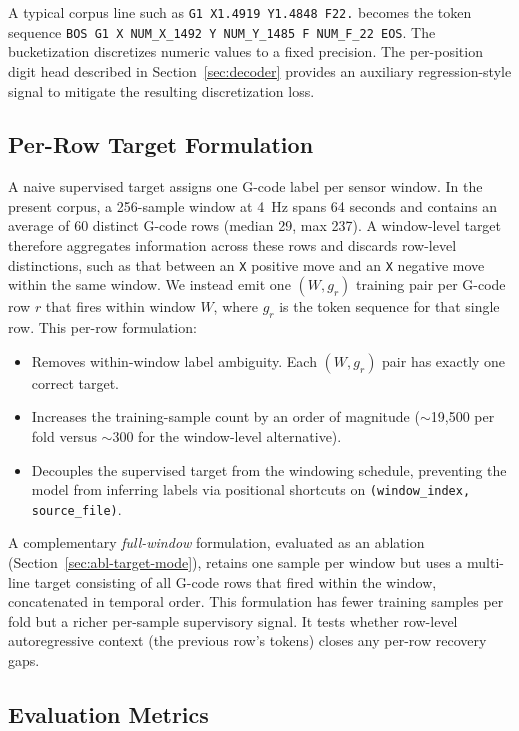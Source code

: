 \documentclass[sensors,article,submit,moreauthors,pdftex]{Definitions/mdpi}
\begin{document}
A typical corpus line such as \texttt{G1 X1.4919 Y1.4848 F22.} becomes the token sequence \texttt{BOS G1 X NUM\_X\_1492 Y NUM\_Y\_1485 F NUM\_F\_22 EOS}. The bucketization discretizes numeric values to a fixed precision. The per-position digit head described in Section~\ref{sec:decoder} provides an auxiliary regression-style signal to mitigate the resulting discretization loss.

\subsection{Per-Row Target Formulation}
\label{sec:per-row}

A naive supervised target assigns one G-code label per sensor window. In the present corpus, a 256-sample window at 4~Hz spans 64 seconds and contains an average of 60 distinct G-code rows (median 29, max 237). A window-level target therefore aggregates information across these rows and discards row-level distinctions, such as that between an \texttt{X} positive move and an \texttt{X} negative move within the same window. We instead emit one $(W, g_r)$ training pair per G-code row $r$ that fires within window $W$, where $g_r$ is the token sequence for that single row. This per-row formulation:

\begin{itemize}
\item Removes within-window label ambiguity. Each $(W, g_r)$ pair has exactly one correct target.
\item Increases the training-sample count by an order of magnitude ($\sim$19{,}500 per fold versus $\sim$300 for the window-level alternative).
\item Decouples the supervised target from the windowing schedule, preventing the model from inferring labels via positional shortcuts on \texttt{(window\_index, source\_file)}.
\end{itemize}

A complementary \emph{full-window} formulation, evaluated as an ablation (Section~\ref{sec:abl-target-mode}), retains one sample per window but uses a multi-line target consisting of all G-code rows that fired within the window, concatenated in temporal order. This formulation has fewer training samples per fold but a richer per-sample supervisory signal. It tests whether row-level autoregressive context (the previous row's tokens) closes any per-row recovery gaps.

\subsection{Evaluation Metrics}
\label{sec:metrics}
\end{document}

